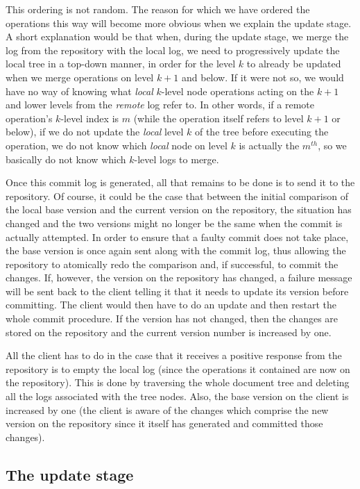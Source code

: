 This ordering is not random. The reason for which we have ordered the operations this way will
become more obvious when we explain the update stage. A short explanation would be that when,
during the update stage, we merge the log from the repository with the local log, we need to
progressively update the local tree in a top-down manner, in order for the level $k$ to
already be updated when we merge operations on level $k+1$ and below. If it were not so,
we would have no way of knowing what \emph{local} $k$-level node operations acting on the
$k+1$ and lower levels from the \emph{remote} log refer to. In other words, if a remote operation's
$k$-level index is $m$ (while the operation itself refers to level $k+1$ or below), if we
do not update the \emph{local} level $k$ of the tree before executing the operation, we
do not know which \emph{local} node on level $k$ is actually the $m^{th}$, so we basically
do not know which $k$-level logs to merge.

Once this commit log is generated, all that remains to be done is to send it to the repository.
Of course, it could be the case that between the initial comparison of the local base version
and the current version on the repository, the situation has changed and the two versions might no
longer be the same when the commit is actually attempted. In order to ensure that a faulty
commit does not take place, the base version is once again sent along with the commit log,
thus allowing the repository to atomically redo the comparison and, if successful, to commit
the changes. If, however, the version on the repository has changed, a failure message will
be sent back to the client telling it that it needs to update its version before committing.
The client would then have to do an update and then restart the whole commit procedure.
If the version has not changed, then the changes are stored on the repository and the current
version number is increased by one.

All the client has to do in the case that it receives a positive response from the repository is
to empty the local log (since the operations it contained are now on the repository). This
is done by traversing the whole document tree and deleting all the logs associated with the
tree nodes. Also, the base version on the client is increased by one (the client is
aware of the changes which comprise the new version on the repository since it itself has
generated and committed those changes).

\subsection{The update stage}
\label{sec:update}

